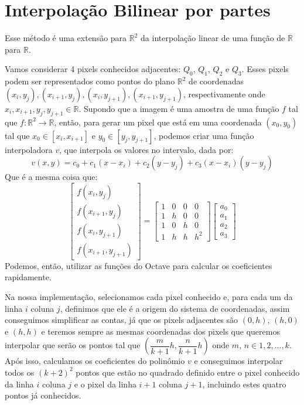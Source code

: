 \documentclass{article}
\begin{document}
	\section{Interpolação Bilinear por partes}
	Esse método é uma extensão para $\mathbb{R}^2$ da interpolação linear de uma função de $\mathbb{R}$ para $\mathbb{R}$. \par
	Vamos considerar 4 pixels conhecidos adjacentes: $Q_{0}$, $Q_{1}$, $Q_{2}$ e $Q_{3}$. Esses pixels podem ser representados como pontos do plano $\mathbb{R}^2$ de coordenadas $(x_{i}, y_{j}), (x_{i+1}, y_{j}), (x_{i}, y_{j+1}), (x_{i+1}, y_{j+1})$, respectivamente onde $x_{i}, x_{i+1}, y_{j}, y_{j+1} \in \mathbb{R}$. Supondo que a imagem é uma amostra de uma função $f$ tal que $f: \mathbb{R}^2 \rightarrow \mathbb{R} $, então, para gerar um pixel que está em uma coordenada $(x_{0}, y_{0})$ tal que $x_{0} \in [x_{i}, x_{i+1}]$ e $y_{0} \in [y_{j}, y_{j+1}]$, podemos criar uma função interpoladora $v$, que interpola os valores no intervalo, dada por:
	 \begin{equation}
	 v(x, y) = c_{0} + c_{1}(x - x_{i}) + c_{2}(y - y_{j}) + c_{3}(x - x_{i})(y - y_{j})
	 \end{equation}
	 Que é a mesma coisa que:
	 \[
	 	\left[
	 		\begin{array}{llll}
				f(x_{i}, y_{j})\\
				f(x_{i+1}, y_{j})\\
				f(x_{i}, y_{j+1})\\
				f(x_{i+1}, y_{j+1})	 		
	 		\end{array}
	 	\right]
	 	=
	 	\left[
	 		\begin{array}{llll}
				1 & 0 & 0 & 0\\
				1 & h & 0 & 0\\
				1 & 0 & h & 0\\
				1 & h & h & h^2	 		
	 		\end{array}
	 	\right]
	 	\left[
	 		\begin{array}{llll}
				a_{0}\\
				a_{1}\\
				a_{2}\\
				a_{3}	 		
	 		\end{array}
	 	\right]
	 \]
	 Podemos, então, utilizar as funções do Octave para calcular os coeficientes rapidamente. \par
	 Na nossa implementação, selecionamos cada pixel conhecido e, para cada um da linha $i$ coluna $j$, definimos que ele é a origem do sistema de coordenadas, assim conseguimos simplificar as contas, já que os pixels adjacentes são $(0, h)$, $(h,0)$ e $(h,h)$ e teremos sempre as mesmas coordenadas dos pixels que queremos interpolar que serão os pontos tal que $(\dfrac{m}{k+1}h, \dfrac{n}{k+1}h)$ onde $m$, $n \in {1, 2, ..., k}$. Após isso, calculamos os coeficientes do polinômio $v$ e conseguimos interpolar todos os $(k+2)^2$ pontos que estão no quadrado definido entre o pixel conhecido da linha $i$ coluna $j$ e o pixel da linha $i+1$ coluna $j+1$, incluindo estes quatro pontos já conhecidos.\par
\end{document}
